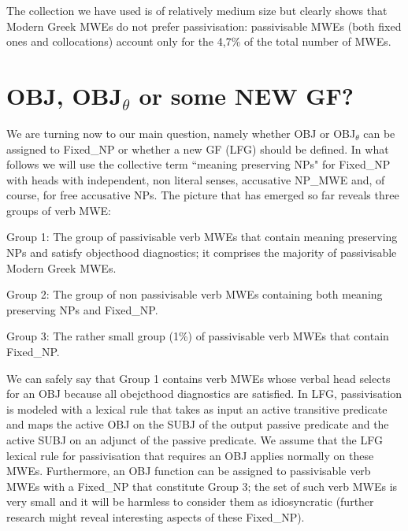 \documentclass[output=paper]{langsci/langscibook}
\begin{document}
The collection we have used is of relatively medium size  but clearly shows that Modern Greek MWEs do not prefer passivisation: passivisable MWEs (both fixed ones and collocations) account only for the 4,7\% of the total number of MWEs.


\section{OBJ, OBJ$_\theta$ or some NEW GF?}
\label{sec:mark:5}
We are turning now to our main question, namely whether OBJ or OBJ$_\theta$ can be assigned to Fixed\_NP or whether a new GF  (LFG) should be defined.  In what follows we will use the collective term ``meaning preserving NPs" for Fixed\_NP with heads with independent, non literal senses, accusative NP\_MWE and, of course, for free accusative NPs. The picture that has emerged so far reveals three groups of verb MWE:


Group 1: The group of passivisable verb MWEs that contain meaning preserving NPs and satisfy objecthood diagnostics; it comprises the majority of passivisable Modern Greek MWEs.  



Group 2: The group of non passivisable verb MWEs  containing both meaning preserving NPs and Fixed\_NP.



Group 3: The rather small group (1\%) of passivisable verb MWEs that contain Fixed\_NP.


We can safely say that Group 1 contains verb MWEs whose verbal head selects
for an OBJ because all obejcthood diagnostics are satisfied. In  LFG, passivisation
 is modeled with a  lexical rule that takes as input an active transitive predicate
and maps the active OBJ on the SUBJ of the output passive predicate and the active SUBJ on
an adjunct of the passive predicate. We  assume that the LFG lexical rule
for passivisation that requires an OBJ applies normally on these MWEs.
Furthermore, an OBJ function can be assigned to passivisable verb MWEs with a Fixed\_NP that constitute Group 3; the set of such verb MWEs is very small and it will be harmless to consider them as idiosyncratic (further research might reveal interesting aspects of these Fixed\_NP). 
\end{document}
